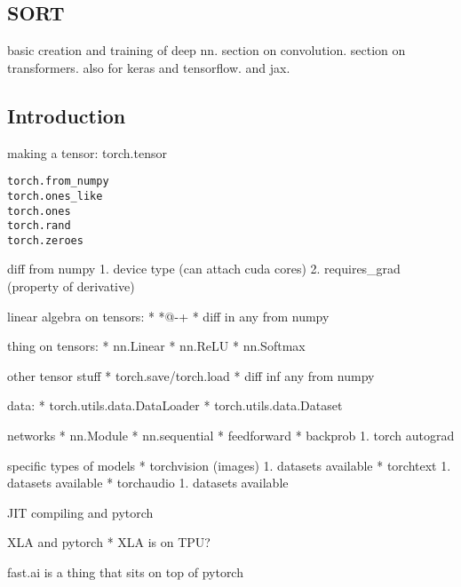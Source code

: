 

\subsection{SORT}

basic creation and training of deep nn.
section on convolution. section on transformers. also for keras and tensorflow. and jax.

\subsection{Introduction}

making a tensor:
torch.tensor

\begin{verbatim}
torch.from_numpy
torch.ones_like
torch.ones
torch.rand
torch.zeroes
\end{verbatim}

diff from numpy
    1. device type (can attach cuda cores)
    2. requires\_grad (property of derivative)



linear algebra on tensors:
  * *@-+
  * diff in any from numpy

thing on tensors:
  * nn.Linear
  * nn.ReLU
  * nn.Softmax

other tensor stuff
  * torch.save/torch.load
  * diff inf any from numpy

data:
  * torch.utils.data.DataLoader
  * torch.utils.data.Dataset

networks
  * nn.Module
  * nn.sequential
  * feedforward
  * backprob
    1. torch autograd

specific types of models
  * torchvision (images)
    1. datasets available
  * torchtext
    1. datasets available
  * torchaudio
    1. datasets available


JIT compiling and pytorch

XLA and pytorch
  * XLA is on TPU?


fast.ai is a thing that sits on top of pytorch
